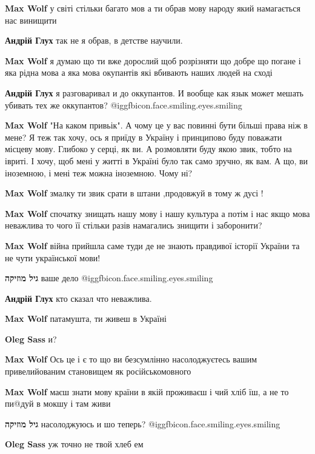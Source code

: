 \begin{itemize}
\begin{itemize}
\textbf{Max Wolf} у світі стільки багато мов а ти обрав мову народу який намагається нас винищити

\textbf{Андрій Глух} так не я обрав, в детстве научили.

\textbf{Max Wolf} я думаю що ти вже дорослий щоб розрізняти що добре що погане і яка рідна мова а яка мова окупантів які вбивають наших людей на сході

\textbf{Андрій Глух} я разговаривал и до оккупантов. И вообще как язык может мешать убивать тех же оккупантов? @igg{fbicon.face.smiling.eyes.smiling} 

\textbf{Max Wolf}
"На каком привьік". А чому це у вас повинні бути більші права ніж в мене? Я теж так хочу, ось я приїду в Україну і принципово буду поважати місцеву мову. Глибоко у серці, як ви. А розмовляти буду якою звик, тобто на івриті. І хочу, щоб мені у житті в Україні було так само зручно, як вам. А що, ви іноземною, і мені теж можна іноземною. Чому ні?

\textbf{Max Wolf} змалку ти звик срати в штани ,продовжуй в тому ж дусі !

\textbf{Max Wolf} спочатку знищать нашу мову і нашу культура а потім і нас якщо мова неважлива то чого її стільки разів намагались знищити і заборонити?

\textbf{Max Wolf} війна прийшла саме туди де не знають правдивої історії України та не чути української мови!

\textbf{גיל מוזיקה} ваше дело @igg{fbicon.face.smiling.eyes.smiling} 

\textbf{Андрій Глух} кто сказал что неважлива.

\textbf{Max Wolf} патамушта, ти живеш в Україні

\textbf{Oleg Sass} и?

\textbf{Max Wolf}
Ось це і є то що ви безсумлінно насолоджуєтесь вашим привелийованим становищем як російськомовного

\textbf{Max Wolf} маєш знати мову країни в якій проживаєш і чий хліб їш, а не то пи@дуй в мокшу і там живи

\textbf{גיל מוזיקה} насолоджуюсь и шо теперь? @igg{fbicon.face.smiling.eyes.smiling} 

\textbf{Oleg Sass} уж точно не твой хлеб ем


\end{itemize}
\end{itemize}
